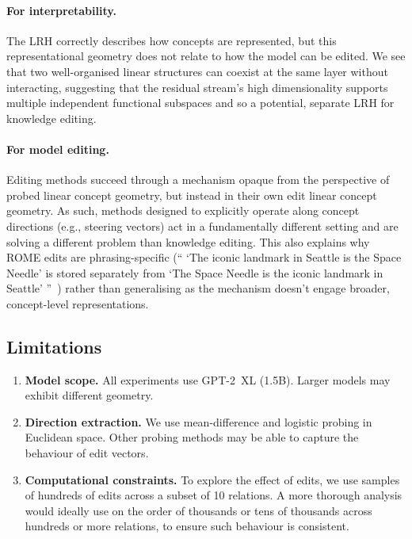 \documentclass[11pt,a4paper]{article}
\begin{document}
\paragraph{For interpretability.}
The LRH correctly describes how concepts are represented, but this representational geometry does not relate to how the model can be edited. We see that two well-organised linear structures can coexist at the same layer without interacting, suggesting that the residual stream's high dimensionality supports multiple independent functional subspaces and so a potential, separate LRH for knowledge editing.

\paragraph{For model editing.}
Editing methods succeed through a mechanism opaque from the perspective of probed linear concept geometry, but instead in their own edit linear concept geometry. As such, methods designed to explicitly operate along concept directions (e.g., steering vectors) act in a fundamentally different setting and are solving a different problem than knowledge editing. This also explains why ROME edits are phrasing-specific (`` `The iconic landmark in Seattle
is the Space Needle' is stored separately from `The Space Needle is the iconic landmark in Seattle' ''~\citep{meng2022locating}) rather than generalising as the mechanism doesn't engage broader, concept-level representations.


\subsection{Limitations}

\begin{enumerate}[nosep]
\item \textbf{Model scope.} All experiments use GPT-2~XL (1.5B). Larger models may exhibit different geometry.
\item \textbf{Direction extraction.} We use mean-difference and logistic probing in Euclidean space. Other probing methods may be able to capture the behaviour of edit vectors.
\item \textbf{Computational constraints.} To explore the effect of edits, we use samples of hundreds of edits across a subset of 10 relations. A more thorough analysis would ideally use on the order of thousands or tens of thousands across hundreds or more relations, to ensure such behaviour is consistent.



\end{enumerate}
\end{document}
